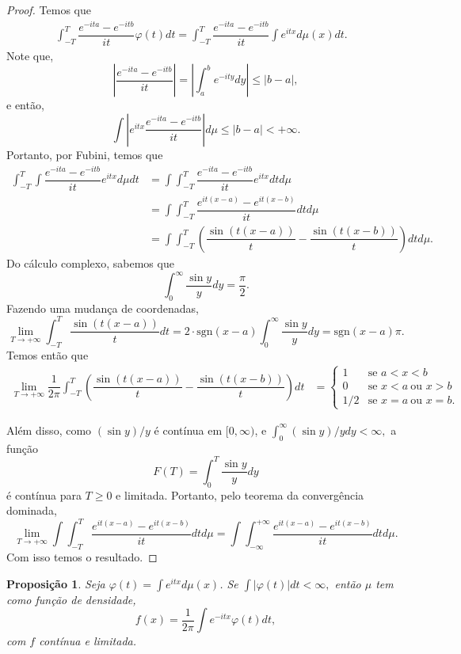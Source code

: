 \documentclass[12pt,a4paper,oneside]{book}
\newtheorem{proposition}[theorem]{Proposi\c{c}\~ao}
\theoremstyle{definition}
\theoremstyle{remark}
\numberwithin{equation}{section}
\begin{document}
\begin{proof}
Temos que
\begin{align*}
\int^T_{-T}\dfrac{e^{-ita}-e^{-itb}}{it} \varphi(t)dt =\int^T_{-T}\dfrac{e^{-ita}-e^{-itb}}{it} \int e^{itx}d\mu(x)dt.  & 
\end{align*}
Note que,
$$\left| \dfrac{ e^{-ita}-e^{-itb}}{it}\right| = \left| \int^b_a e^{-ity}dy  \right| \leq |b-a|, $$
e então,
$$\int \left|e^{itx}\dfrac{ e^{-ita}-e^{-itb}}{it}\right|d\mu \leq |b-a| < +\infty. $$
Portanto, por Fubini, temos que
\begin{align*}
\int^T_{-T}\int \dfrac{e^{-ita}-e^{-itb}}{it}  e^{itx}d\mu dt &=\int\int^T_{-T} \dfrac{e^{-ita}-e^{-itb}}{it}  e^{itx}dtd\mu\\
&=\int\int^T_{-T} \dfrac{e^{it(x-a)}-e^{it(x-b)}}{it}  dtd\mu\\
& =\int\int^T_{-T}\left(\dfrac{\sin(t(x-a))}{t} -\dfrac{\sin(t(x-b))}{t}\right)dtd\mu .
\end{align*}
Do cálculo complexo, sabemos que 
$$\int_0^\infty \dfrac{\sin y}{y}dy = \dfrac{\pi}{2}. $$
Fazendo uma mudança de coordenadas, 
$$\lim _{T\rightarrow +\infty} \int^T_{-T}\dfrac{\sin(t(x-a))}{t}dt = 2\cdot \text{sgn}(x-a)\int_0^\infty \dfrac{\sin y}{y}dy = \text{sgn}(x-a) \pi.   $$
Temos então que
\begin{align*}
\lim _{T\rightarrow +\infty} \dfrac{1}{2\pi }\int^T_{-T}\left(\dfrac{\sin(t(x-a))}{t} -\dfrac{\sin(t(x-b))}{t}\right)dt & = 
\begin{cases} 
1& \textrm{se } a< x<b\\ 
0 & \text{se } x<a\ \text{ou } x>b\\
1/2 & \text{se } x=a\ \text{ou } x=b.
\end{cases} 
\end{align*}


Além disso, como $(\sin y)/y$ é contínua em $[0,\infty)$, e $\int_0^\infty (\sin y)/y dy <\infty, $ a função 
$$F(T) = \int_0^T \dfrac{\sin y}{y}dy$$
é contínua para $T\geq 0$ e limitada. Portanto, pelo teorema da convergência dominada, 
$$\lim _{T\rightarrow +\infty}\int\int^T_{-T} \dfrac{e^{it(x-a)}-e^{it(x-b)}}{it}  dtd\mu  = \int\int^{+\infty}_{-\infty} \dfrac{e^{it(x-a)}-e^{it(x-b)}}{it}  dtd\mu .$$
Com isso temos o resultado.
\end{proof}


\begin{proposition}\label{prop - densidade é a fourier inversa da fc}
Seja $\varphi(t) = \int e^{itx}d\mu(x)$. Se
$ \int |\varphi(t)|dt<\infty,$ então $\mu$ tem como função de  densidade,
$$ f(x) = \dfrac{1}{2\pi}\int e^{-itx}\varphi(t)dt,$$
com $f$ contínua e limitada.
\end{proposition}
\end{document}
